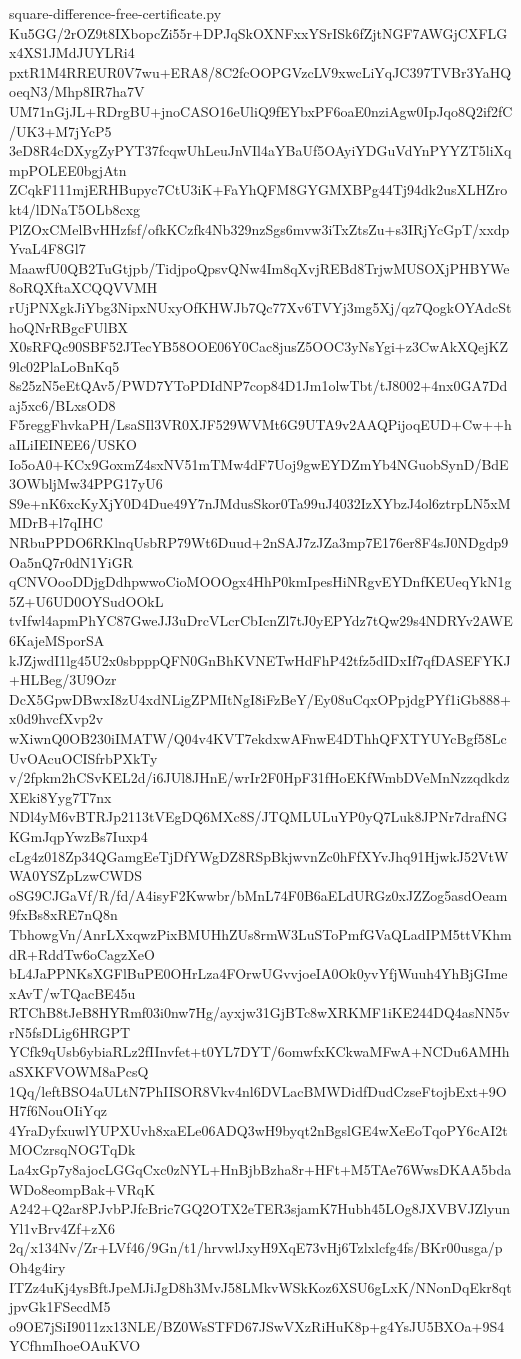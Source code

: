 \documentclass[11pt]{article}
\theoremstyle{definition}
\theoremstyle{remark}
\begin{document}
\begin{filecontents*}[overwrite]{square-difference-free-certificate.py}
Ku5GG/2rOZ9t8IXbopcZi55r+DPJqSkOXNFxxYSrISk6fZjtNGF7AWGjCXFLGx4XS1JMdJUYLRi4
pxtR1M4RREUR0V7wu+ERA8/8C2fcOOPGVzcLV9xwcLiYqJC397TVBr3YaHQoeqN3/Mhp8IR7ha7V
UM71nGjJL+RDrgBU+jnoCASO16eUliQ9fEYbxPF6oaE0nziAgw0IpJqo8Q2if2fC/UK3+M7jYcP5
3eD8R4cDXygZyPYT37fcqwUhLeuJnVIl4aYBaUf5OAyiYDGuVdYnPYYZT5liXqmpPOLEE0bgjAtn
ZCqkF111mjERHBupyc7CtU3iK+FaYhQFM8GYGMXBPg44Tj94dk2usXLHZrokt4/lDNaT5OLb8cxg
PlZOxCMelBvHHzfsf/ofkKCzfk4Nb329nzSgs6mvw3iTxZtsZu+s3IRjYcGpT/xxdpYvaL4F8Gl7
MaawfU0QB2TuGtjpb/TidjpoQpsvQNw4Im8qXvjREBd8TrjwMUSOXjPHBYWe8oRQXftaXCQQVVMH
rUjPNXgkJiYbg3NipxNUxyOfKHWJb7Qc77Xv6TVYj3mg5Xj/qz7QogkOYAdcSthoQNrRBgcFUlBX
X0sRFQc90SBF52JTecYB58OOE06Y0Cac8jusZ5OOC3yNsYgi+z3CwAkXQejKZ9lc02PlaLoBnKq5
8s25zN5eEtQAv5/PWD7YToPDIdNP7cop84D1Jm1olwTbt/tJ8002+4nx0GA7Ddaj5xc6/BLxsOD8
F5reggFhvkaPH/LsaSIl3VR0XJF529WVMt6G9UTA9v2AAQPijoqEUD+Cw++haILiIEINEE6/USKO
Io5oA0+KCx9GoxmZ4sxNV51mTMw4dF7Uoj9gwEYDZmYb4NGuobSynD/BdE3OWbljMw34PPG17yU6
S9e+nK6xcKyXjY0D4Due49Y7nJMdusSkor0Ta99uJ4032IzXYbzJ4ol6ztrpLN5xMMDrB+l7qIHC
NRbuPPDO6RKlnqUsbRP79Wt6Duud+2nSAJ7zJZa3mp7E176er8F4sJ0NDgdp9Oa5nQ7r0dN1YiGR
qCNVOooDDjgDdhpwwoCioMOOOgx4HhP0kmIpesHiNRgvEYDnfKEUeqYkN1g5Z+U6UD0OYSudOOkL
tvIfwl4apmPhYC87GweJJ3uDrcVLcrCbIcnZl7tJ0yEPYdz7tQw29s4NDRYv2AWE6KajeMSporSA
kJZjwdI1lg45U2x0sbpppQFN0GnBhKVNETwHdFhP42tfz5dIDxIf7qfDASEFYKJ+HLBeg/3U9Ozr
DcX5GpwDBwxI8zU4xdNLigZPMItNgI8iFzBeY/Ey08uCqxOPpjdgPYf1iGb888+x0d9hvcfXvp2v
wXiwnQ0OB230iIMATW/Q04v4KVT7ekdxwAFnwE4DThhQFXTYUYcBgf58LcUvOAcuOCISfrbPXkTy
v/2fpkm2hCSvKEL2d/i6JUl8JHnE/wrIr2F0HpF31fHoEKfWmbDVeMnNzzqdkdzXEki8Yyg7T7nx
NDl4yM6vBTRJp2113tVEgDQ6MXc8S/JTQMLULuYP0yQ7Luk8JPNr7drafNGKGmJqpYwzBs7Iuxp4
cLg4z018Zp34QGamgEeTjDfYWgDZ8RSpBkjwvnZc0hFfXYvJhq91HjwkJ52VtWWA0YSZpLzwCWDS
oSG9CJGaVf/R/fd/A4isyF2Kwwbr/bMnL74F0B6aELdURGz0xJZZog5asdOeam9fxBs8xRE7nQ8n
TbhowgVn/AnrLXxqwzPixBMUHhZUs8rmW3LuSToPmfGVaQLadIPM5ttVKhmdR+RddTw6oCagzXeO
bL4JaPPNKsXGFlBuPE0OHrLza4FOrwUGvvjoeIA0Ok0yvYfjWuuh4YhBjGImexAvT/wTQacBE45u
RTChB8tJeB8HYRmf03i0nw7Hg/ayxjw31GjBTc8wXRKMF1iKE244DQ4asNN5vrN5fsDLig6HRGPT
YCfk9qUsb6ybiaRLz2fIInvfet+t0YL7DYT/6omwfxKCkwaMFwA+NCDu6AMHhaSXKFVOWM8aPcsQ
1Qq/leftBSO4aULtN7PhIISOR8Vkv4nl6DVLacBMWDidfDudCzseFtojbExt+9OH7f6NouOIiYqz
4YraDyfxuwlYUPXUvh8xaELe06ADQ3wH9byqt2nBgslGE4wXeEoTqoPY6cAI2tMOCzrsqNOGTqDk
La4xGp7y8ajocLGGqCxc0zNYL+HnBjbBzha8r+HFt+M5TAe76WwsDKAA5bdaWDo8eompBak+VRqK
A242+Q2ar8PJvbPJfcBric7GQ2OTX2eTER3sjamK7Hubh45LOg8JXVBVJZlyunYl1vBrv4Zf+zX6
2q/x134Nv/Zr+LVf46/9Gn/t1/hrvwlJxyH9XqE73vHj6Tzlxlcfg4fs/BKr00usga/pOh4g4iry
ITZz4uKj4ysBftJpeMJiJgD8h3MvJ58LMkvWSkKoz6XSU6gLxK/NNonDqEkr8qtjpvGk1FSecdM5
o9OE7jSiI9011zx13NLE/BZ0WsSTFD67JSwVXzRiHuK8p+g4YsJU5BXOa+9S4YCfhmIhoeOAuKVO

\end{filecontents*}
\end{document}
